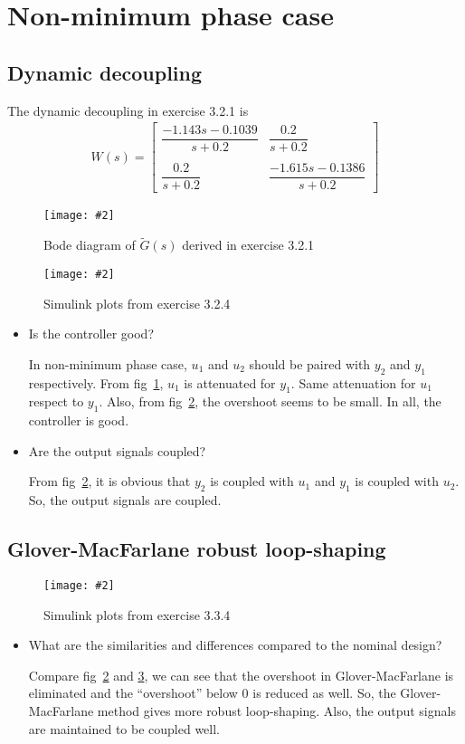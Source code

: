 \documentclass[11pt,a4paper]{article}
\newcommand{\image}[3]{
	\begin{figure}[!ht]
		\centering
	    \texttt{[image: \#2]}
		\caption{#3}
		\label{fig:#2}
	\end{figure}
}
\begin{document}
	
\section*{Non-minimum phase case}
\subsection*{Dynamic decoupling}
\par The dynamic decoupling in exercise 3.2.1 is
	\begin{align*}
		W(s) = \begin{bmatrix} \dfrac{-1.143s - 0.1039}{s + 0.2} & \dfrac{0.2}{s + 0.2} \\ & \\ \dfrac{0.2}{s + 0.2} & \dfrac{-1.615s - 0.1386}{s + 0.2} \end{bmatrix}
	\end{align*}

	\image{0.75}{m321}{Bode diagram of $\tilde{G}(s)$ derived in exercise 3.2.1}
	\image{0.75}{m324}{Simulink plots from exercise 3.2.4}

	\begin{itemize}
		\item Is the controller good?
		\par In non-minimum phase case, $u_{1}$ and $u_{2}$ should be paired with $y_{2}$ and $y_{1}$ respectively. From fig~\ref{fig:m321}, $u_{1}$ is attenuated for $y_{1}$. Same attenuation for $u_{1}$ respect to $y_{1}$. Also, from fig~\ref{fig:m324}, the overshoot seems to be small. In all, the controller is good.
		
		\item Are the output signals coupled?
		\par From fig~\ref{fig:m324}, it is obvious that $y_{2}$ is coupled with $u_{1}$ and $y_{1}$ is coupled with $u_{2}$. So, the output signals are coupled.
	\end{itemize}

\subsection*{Glover-MacFarlane robust loop-shaping}
	\image{0.75}{m334}{Simulink plots from exercise 3.3.4}
	
	\begin{itemize}
		\item What are the similarities and differences compared to the nominal design?
		\par Compare fig~\ref{fig:m324} and \ref{fig:m334}, we can see that the overshoot in Glover-MacFarlane is eliminated and the ``overshoot'' below $0$ is reduced as well. So, the Glover-MacFarlane method gives more robust loop-shaping. Also, the output signals are maintained to be coupled well.
	\end{itemize}
	
\end{document}
